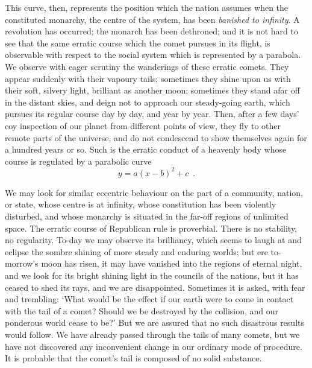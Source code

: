 \documentclass{jocg}
\begin{document}
This curve, then, represents the position which the nation assumes
when the constituted monarchy, the centre of the system, has been
\emph{banished to infinity}. A revolution has occurred; the monarch has
been dethroned; and it is not hard to see that the same erratic course
which the comet pursues in its flight, is observable with respect to the
social system which is represented by a parabola. We observe with eager
scrutiny the wanderings of these erratic comets. They appear suddenly
with their vapoury tails; sometimes they shine upon us with their soft,
silvery light, brilliant as another moon; sometimes they stand afar off
in the distant skies, and deign not to approach our steady-going earth,
which pursues its regular course day by day, and year by year. Then, after
a few days’ coy inspection of our planet from different points of view,
they fly to other remote parts of the universe, and do not condescend
to show themselves again for a  hundred years or so. Such is the erratic
conduct of a heavenly body whose course is regulated by a parabolic curve
\[
     y = a(x-b)^2 + c \enspace .
\]

We may look for similar eccentric behaviour on the part of a community,
nation, or state, whose centre is at infinity, whose constitution has
been violently disturbed, and whose monarchy is situated in the far-off
regions of unlimited space. The erratic course of Republican rule is
proverbial. There is no stability, no regularity. To-day we may observe
its brilliancy, which seems to laugh at and eclipse the sombre shining of
more steady and enduring worlds; but ere to-morrow’s moon has risen,
it may have vanished into the regions of eternal night, and we look
for its bright shining light in the councils of the nations, but it has
ceased to shed its rays, and we are disappointed. Sometimes it is asked,
with fear and trembling: ‘What would be the effect if our earth were
to come in contact with the tail of a comet? Should we be destroyed
by the collision, and our ponderous world cease to be?’ But we are
assured that no such disastrous results would follow. We have already
passed through the tails of many comets, but we have not discovered any
inconvenient change in our ordinary mode of procedure. It is probable
that the comet’s tail is composed of no solid substance.
\end{document}
